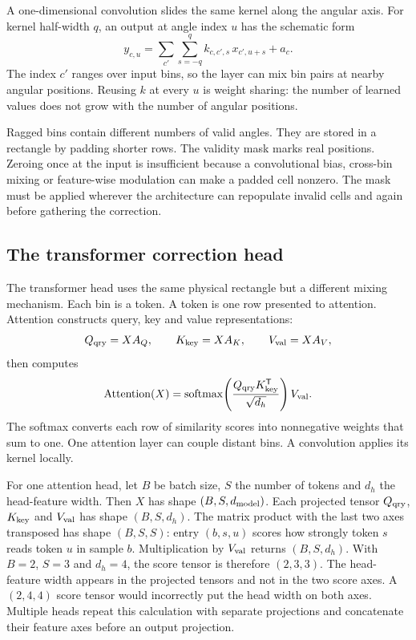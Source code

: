 \documentclass[10pt,aps,prd,twocolumn,nofootinbib]{revtex4-2}
\begin{document}
A one-dimensional convolution slides the same kernel along the angular axis.
For kernel half-width $q$, an output at angle index $u$ has the schematic form
\begin{equation*}
 y_{c,u}=\sum_{c'}\sum_{s=-q}^{q}
          k_{c,c',s}\,x_{c',u+s}+a_c.
\end{equation*}
The index $c'$ ranges over input bins, so the layer can mix bin pairs at
nearby angular positions.  Reusing $k$ at every $u$ is weight sharing: the
number of learned values does not grow with the number of angular positions.

Ragged bins contain different numbers of valid angles.  They are stored in a
rectangle by padding shorter rows.  The validity
mask marks real positions.  Zeroing once at the input is insufficient because
a convolutional bias, cross-bin mixing or feature-wise modulation can make a
padded cell nonzero.  The mask must be applied wherever the architecture can
repopulate invalid cells and again before gathering the correction.

\subsection{The transformer correction head}

The transformer head uses the same physical rectangle but a different mixing
mechanism.  Each bin is a token.  A token is one row presented to attention.
Attention constructs query, key and value representations:
\begin{equation*}
 Q_{\rm qry}=XA_Q,\qquad
 K_{\rm key}=XA_K,\qquad
 V_{\rm val}=XA_V,
\end{equation*}
then computes
\begin{equation}
 \operatorname{Attention}(X)
 =\operatorname{softmax}\!\left(
   \frac{Q_{\rm qry}K_{\rm key}^{\mathsf T}}{\sqrt{d_h}}
  \right)V_{\rm val}.
 \label{eq:attention}
\end{equation}
The softmax converts each row of similarity scores into nonnegative weights
that sum to one.  One attention layer can couple distant bins.  A convolution
applies its kernel locally.

For one attention head, let $B$ be batch size, $S$ the number of tokens and
$d_h$ the head-feature width.  Then $X$ has shape $(B,S,d_{\rm model})$.
Each projected tensor $Q_{\rm qry}$, $K_{\rm key}$ and $V_{\rm val}$ has
shape $(B,S,d_h)$.  The matrix product with the last two axes transposed has
shape $(B,S,S)$: entry $(b,s,u)$ scores how strongly token $s$ reads token
$u$ in sample $b$.  Multiplication by $V_{\rm val}$ returns
$(B,S,d_h)$.  With $B=2$, $S=3$ and $d_h=4$, the score tensor is therefore
$(2,3,3)$.  The head-feature width appears in the projected tensors and not
in the two score axes.  A $(2,4,4)$ score tensor would incorrectly put the
head width on both axes.  Multiple heads repeat this calculation with
separate projections and concatenate their feature axes before an output
projection.
\end{document}
